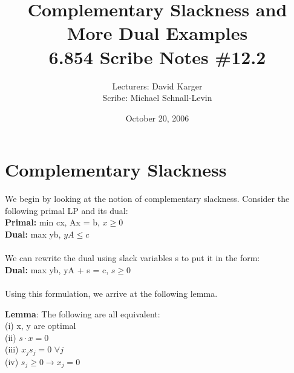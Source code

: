 \documentclass{article}
\title{Complementary Slackness and More Dual Examples\\ 6.854 Scribe Notes \#12.2}
\date{October 20, 2006}
\author{Lecturers: David Karger\\ Scribe: Michael Schnall-Levin}
\begin{document}
%
%
%
%

%


\begin{center}
\end{center}

\section{Complementary Slackness}
We begin by looking at the notion of complementary slackness.  Consider the following primal LP and its dual:\\
\textbf{Primal:} min cx, Ax = b, $x\geq 0$\\
\textbf{Dual:} max yb, $yA \leq c$\\
\\
We can rewrite the dual using slack variables s to put it in the form:\\
\textbf{Dual:} max yb, yA + s = c, $s \geq 0$\\
\\
Using this formulation, we arrive at the following lemma.

\textbf{Lemma}:
The following are all equivalent:\\
(i) x, y are optimal\\
(ii) $s\cdot x = 0$\\
(iii) $x_{j}s_{j} = 0$ $\forall j$\\
(iv) $s_{j} \geq 0 \rightarrow x_{j} = 0$
\end{document}
